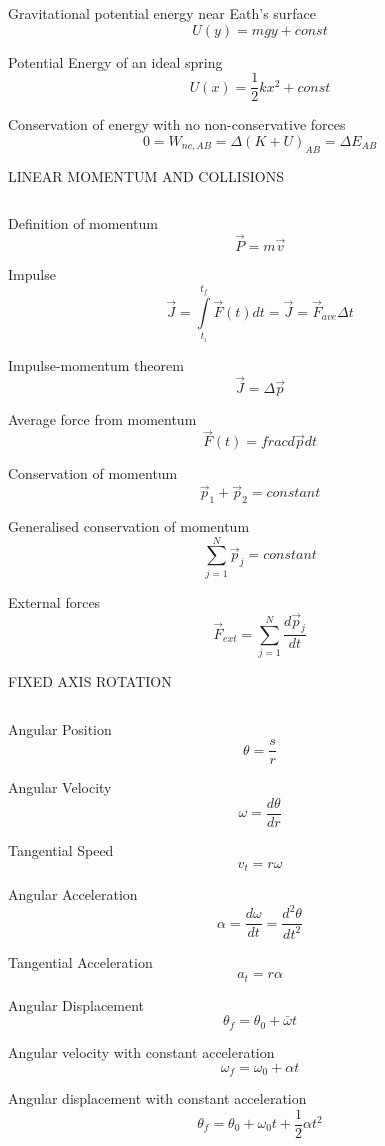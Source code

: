 \documentclass[12pt, letterpaper, twoside]{article}
\begin{document}
Gravitational potential energy near Eath's surface
$$ U(y) = mgy + const $$


Potential Energy of an ideal spring
$$  U(x) = \frac{1}{2} k x^2 + const $$


Conservation of energy with no non-conservative forces
$$ 0 = W_{nc,AB} = \Delta (K + U)_{AB} = \Delta E_{AB} $$



\newpage

LINEAR MOMENTUM AND COLLISIONS

$$ $$

Definition of momentum
$$ \overrightarrow{P} = m \overrightarrow{v} $$


Impulse
$$ \overrightarrow{J} = \int\limits_{t_i}^{t_f} \overrightarrow{F}(t) dt  = \overrightarrow{J} = \overrightarrow{F}_{ave} \Delta t $$


Impulse-momentum theorem
$$ \overrightarrow{J} = \Delta \overrightarrow{p}$$


Average force from momentum
$$ \overrightarrow{F} (t) = frac{d \overrightarrow{p}}{dt} $$


Conservation of momentum
$$  \overrightarrow{p}_1 +  \overrightarrow{p}_2 = constant $$


Generalised conservation of momentum
$$  \displaystyle\sum_{j=1}^{N} \overrightarrow{p}_j = constant $$



External forces
$$ \overrightarrow{F}_{ext} = \displaystyle\sum_{j=1}^{N} \frac{d \overrightarrow{p}_j}{dt} $$


\newpage



FIXED AXIS ROTATION

$$ $$


Angular Position
$$ \theta = \frac{s}{r} $$


Angular Velocity
$$ \omega = \frac{d \theta}{dr} $$


Tangential Speed
$$ v_t = r \omega $$

Angular Acceleration
$$ \alpha =\frac{d \omega}{dt} = \frac{d^2 \theta}{d t^2}$$


Tangential Acceleration
$$ a_t = r \alpha $$


Angular Displacement
$$ \theta_f = \theta_0 + \bar{\omega} t $$


Angular velocity with constant acceleration
$$ \omega_f = \omega_0 + \alpha t $$


Angular displacement with constant acceleration
$$ \theta_f = \theta_0 + \omega_0 t + \frac{1}{2} \alpha t^2 $$
\end{document}
